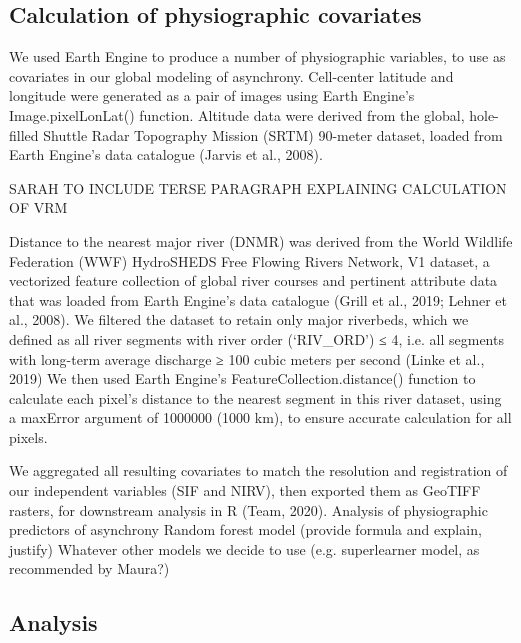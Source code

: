 \documentclass[9pt,twocolumn,twoside,lineno]{pnas-new}
\begin{document}
{\subsection*{Calculation of physiographic covariates}
We used Earth Engine to produce a number of physiographic variables, to
use as covariates in our global modeling of asynchrony. Cell-center
latitude and longitude were generated as a pair of images using Earth
Engine’s Image.pixelLonLat() function. Altitude data were derived from
the global, hole-filled Shuttle Radar Topography Mission (SRTM) 90-meter
dataset, loaded from Earth Engine’s data catalogue (Jarvis et al., 2008).


SARAH TO INCLUDE TERSE PARAGRAPH EXPLAINING CALCULATION OF VRM

Distance to the nearest major river (DNMR) was derived from the World
Wildlife Federation (WWF) HydroSHEDS Free Flowing Rivers Network, V1
dataset, a vectorized feature collection of global river courses and
pertinent attribute data that was loaded from Earth Engine’s data
catalogue (Grill et al., 2019; Lehner et al., 2008). We filtered the
dataset to retain only major riverbeds, which we defined as all river
segments with river order (‘RIV_ORD’) ≤ 4, i.e. all segments with
long-term average discharge ≥ 100 cubic meters per second (Linke et al.,
2019) We then used Earth Engine’s FeatureCollection.distance() function
to calculate each pixel’s distance to the nearest segment in this river
dataset, using a maxError argument of 1000000 (1000 km), to ensure
accurate calculation for all pixels.

We aggregated all resulting covariates to match the resolution and
registration of our independent variables (SIF and NIRV), then exported
them as GeoTIFF rasters, for downstream analysis in R (Team, 2020).
Analysis of physiographic predictors of asynchrony
Random forest model (provide formula and explain, justify)
Whatever other models we decide to use (e.g. superlearner model, as
recommended by Maura?)


\subsection*{Analysis}



} %

\showmatmethods{} %
\end{document}
